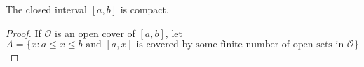 \begin{theorem}
    \label{heineborel}
    The closed interval $[a,b]$ is compact.
\end{theorem}

\begin{tcolorbox}
    \begin{proof}
        If $\mathscr{O}$ is an open cover of $[a,b]$, let
        $$A=\{x: a\le x\le b \text{ and $[a,x]$ is covered
        by some finite number of open sets in $\mathscr{O}$}\}$$
    \end{proof}
\end{tcolorbox}